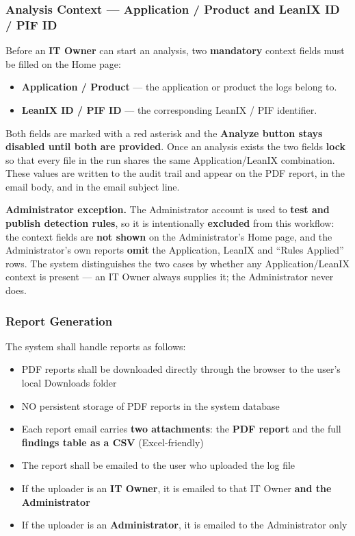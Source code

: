 \documentclass[12pt,a4paper]{article}
\begin{document}
\subsubsection{Analysis Context --- Application / Product and LeanIX ID / PIF ID}
Before an \textbf{IT Owner} can start an analysis, two \textbf{mandatory} context fields must be
filled on the Home page:
\begin{itemize}
    \item \textbf{Application / Product} --- the application or product the logs belong to.
    \item \textbf{LeanIX ID / PIF ID} --- the corresponding LeanIX / PIF identifier.
\end{itemize}
Both fields are marked with a red asterisk and the \textbf{Analyze button stays disabled until both
are provided}. Once an analysis exists the two fields \textbf{lock} so that every file in the run
shares the same Application/LeanIX combination. These values are written to the audit trail and
appear on the PDF report, in the email body, and in the email subject line.

\textbf{Administrator exception.} The Administrator account is used to \textbf{test and publish
detection rules}, so it is intentionally \textbf{excluded} from this workflow: the context fields
are \textbf{not shown} on the Administrator's Home page, and the Administrator's own reports
\textbf{omit} the Application, LeanIX and ``Rules Applied'' rows. The system distinguishes the two
cases by whether any Application/LeanIX context is present --- an IT Owner always supplies it; the
Administrator never does.

\subsubsection{Report Generation}
The system shall handle reports as follows:
\begin{itemize}
    \item PDF reports shall be downloaded directly through the browser to the user's local Downloads folder
    \item NO persistent storage of PDF reports in the system database
    \item Each report email carries \textbf{two attachments}: the \textbf{PDF report} and
          the full \textbf{findings table as a CSV} (Excel-friendly)
    \item The report shall be emailed to the user who uploaded the log file
    \item If the uploader is an \textbf{IT Owner}, it is emailed to that IT Owner
          \textbf{and the Administrator}
    \item If the uploader is an \textbf{Administrator}, it is emailed to the Administrator only
\end{itemize}
\end{document}

